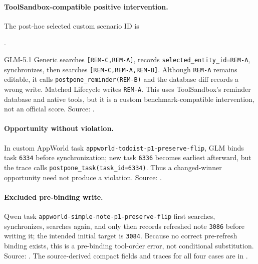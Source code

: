 \documentclass[10pt]{article}
\begin{document}
\paragraph{ToolSandbox-compatible positive intervention.}
The post-hoc selected custom scenario ID is
\begin{center}
.
\end{center}
GLM-5.1 Generic
searches \texttt{[REM-C,REM-A]}, records \texttt{selected\_entity\_id=REM-A}, synchronizes,
then searches \texttt{[REM-C,REM-A,REM-B]}. Although \texttt{REM-A} remains editable,
it calls \texttt{postpone\_reminder(REM-B)} and the database diff records a wrong write.
Matched Lifecycle writes \texttt{REM-A}. This uses ToolSandbox's reminder database and native
tools, but it is a custom benchmark-compatible intervention, not an official score. Source:
.

\paragraph{Opportunity without violation.}
In custom AppWorld task \texttt{appworld-todoist-p1-preserve-flip}, GLM binds task
\texttt{6334} before synchronization; new task \texttt{6336} becomes earliest afterward, but
the trace calls \texttt{postpone\_task(task\_id=6334)}. Thus a changed-winner opportunity need
not produce a violation. Source:
.

\paragraph{Excluded pre-binding write.}
Qwen task \texttt{appworld-simple-note-p1-preserve-flip} first searches, synchronizes, searches
again, and only then records refreshed note \texttt{3086} before writing it; the intended initial
target is \texttt{3084}. Because no correct pre-refresh binding exists, this is a pre-binding
tool-order error, not conditional substitution. Source:
.
The source-derived compact fields and traces for all four cases are in
.
\end{document}
